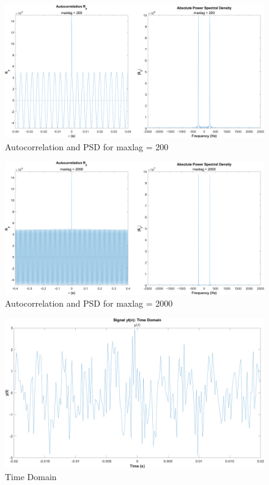 \documentclass[12pt]{article}
\begin{document}
\begin{figure}[h]
	\centering
	\includegraphics[width=\textwidth]{exp2_maxlag_200}
	\caption{\label{fig:exp2_maxlag200}Autocorrelation and PSD for maxlag = 200}
\end{figure}

\begin{figure}[h]
	\centering
	\includegraphics[width=\textwidth]{exp2_maxlag_2000}
	\caption{\label{fig:exp2_maxlag2000}Autocorrelation and PSD for maxlag = 2000}
\end{figure}


\begin{figure}[h]
	\centering
	\includegraphics[width=\textwidth]{exp2_time}
	\caption{\label{fig:exp2_time}Time Domain}
\end{figure}
\end{document}
